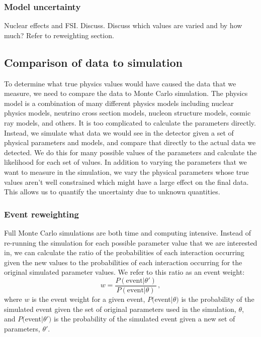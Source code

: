   \subsubsection{Model uncertainty}\label{sec:modeluncertainty}
    Nuclear effects and FSI. Discuss. Discuss which values are varied and by
    how much? Refer to reweighting section. 

\subsection{Comparison of data to simulation}
  To determine what true physics values would have caused the data that we
  measure, we need to compare the data to Monte Carlo simulation. The physics
  model is a combination of many different physics models including nuclear
  physics models, neutrino cross section models, nucleon structure models,
  cosmic ray models, and others. It is too complicated to calculate the
  parameters directly. Instead, we simulate what data we would see in the
  detector given a set of physical parameters and models, and compare that
  directly to the actual data we detected. We do this for many possible values
  of the parameters and calculate the likelihood for each set of values. In
  addition to varying the parameters that we want to measure in the simulation,
  we vary the physical parameters whose true values aren't well constrained
  which might have a large effect on the final data. This allows us to quantify
  the uncertainty due to unknown quantities.
  \subsubsection{Event reweighting}\label{sec:reweighting}
    Full Monte Carlo simulations are both time and computing intensive. Instead
    of re-running the simulation for each possible parameter value that we are
    interested in, we can calculate the ratio of the probabilities of each
    interaction occurring given the new values to the probabilities of each
    interaction occurring for the original simulated parameter values. We refer
    to this ratio as an event weight:
    \begin{equation}
      w = \frac{P(\textrm{event}|\theta')}{P(\textrm{event}|\theta)} \,,
    \end{equation}
    where $w$ is the event weight for a given event, $P($event$|\theta)$ is the
    probability of the simulated event given the set of original parameters
    used in the simulation, $\theta$, and $P($event$|\theta')$ is the
    probability of the simulated event given a new set of parameters,
    $\theta'$.

